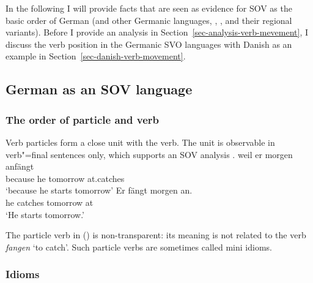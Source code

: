 
In the following I will provide facts that are seen as evidence for SOV as the basic order of German
(and other Germanic languages, \eg {}, ,  and their regional
variants). Before I provide an analysis in Section~\ref{sec-analysis-verb-mevement}, I discuss the 
verb position in the Germanic SVO languages with Danish as an example in Section~\ref{sec-danish-verb-movement}.

\subsection{German as an SOV language}
\label{sec-German-as-SOV}

\subsubsection{The order of particle and verb}

Verb particles form a close unit with the verb. The unit is observable in verb"=final sentences only,
which supports an SOV analysis \citep[]{Bierwisch63a}. 
\eal
\ex 
\gll weil er morgen anfängt\\
     because he tomorrow at.catches\\
\glt `because he starts tomorrow'
\ex 
\gll Er fängt morgen an.\\
     he catches tomorrow at\\
\glt `He starts tomorrow.'
\zl

\noindent
The particle verb in () is non-transparent: its meaning is not related to the verb
\emph{fangen} `to catch'. Such particle verbs are sometimes called mini
idioms. 

\subsubsection{Idioms}


